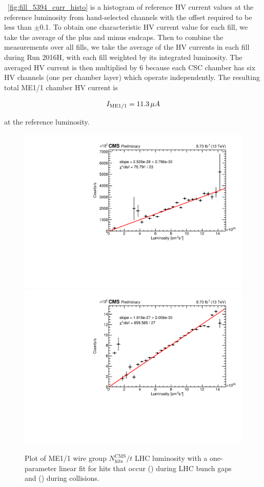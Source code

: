 \Fig~\ref{fig:fill_5394_curr_histo} is a histogram of reference HV current values at the reference luminosity from hand-selected channels with the offset required to be less than $\pm$0.1\muA. To obtain one characteristic HV current value for each fill, we take the average of the plus and minus endcaps. Then to combine the measurements over all fills, we take the average of the HV currents in each fill during Run 2016H, with each fill weighted by its integrated luminosity. The averaged HV current is then multiplied by 6 because each CSC chamber has six HV channels (one per chamber layer) which operate independently. The resulting total ME1/1 chamber HV current is 

\begin{equation}
	I_{\text{ME1/1}} = 11.3\,\mu A
\end{equation}

at the reference luminosity.

\begin{figure}
	\centering
	\includegraphics[width=\dummyFigWidth]{figures/neutron/luminosity_11_wire_early_CHAM_TIME_20180416_fit.pdf}
	\includegraphics[width=\dummyFigWidth]{figures/neutron/luminosity_11_wire_total_CHAM_TIME_20180416_fit.pdf}
	\caption{Plot of ME1/1 wire group ${N}^\text{CMS}_\text{hits} / {t}$ \vs LHC luminosity with a one-parameter linear fit for hits that occur () during LHC bunch gaps and () during \pp collisions.}
	\label{fig:ME11_HvsL}
\end{figure}


